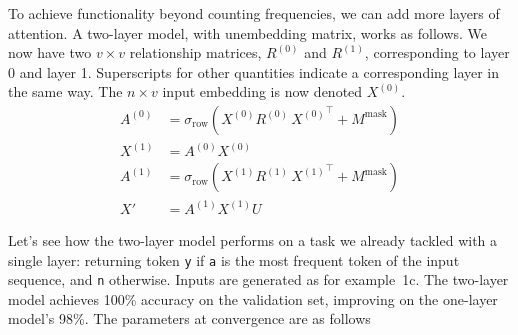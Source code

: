\documentclass{article}
\newcommand{\Tr}{^{\top}} %
\newcommand{\by}{\times}
\begin{document}
To achieve functionality beyond counting frequencies, we can add more
layers of attention. A two-layer model, with unembedding matrix, works
as follows. We now have two $v \by v$ relationship matrices, $R^{(0)}$
and $R^{(1)}$, corresponding to layer 0 and layer 1. Superscripts for
other quantities indicate a corresponding layer in the same way. The
$n \by v$ input embedding is now denoted $X^{(0)}$.
\begin{displaymath}
\begin{aligned}
  A^{(0)} &= \sigma_\text{row}(X^{(0)} R^{(0)}\, {X^{(0)}}\Tr + M^\text{mask}) \\
  X^{(1)} &= A^{(0)} X^{(0)} \\
  A^{(1)} &= \sigma_\text{row}(X^{(1)} R^{(1)}\, {X^{(1)}}\Tr + M^\text{mask}) \\
  X' &= A^{(1)} X^{(1)} U
\end{aligned}
\end{displaymath}

Let's see how the two-layer model performs on a task we already
tackled with a single layer: returning token \texttt{y} if \texttt{a}
is the most frequent token of the input sequence, and \texttt{n}
otherwise. Inputs are generated as for example~1c. The two-layer model
achieves 100\% accuracy on the validation set, improving on the
one-layer model's 98\%. The parameters at convergence are as follows
\end{document}
